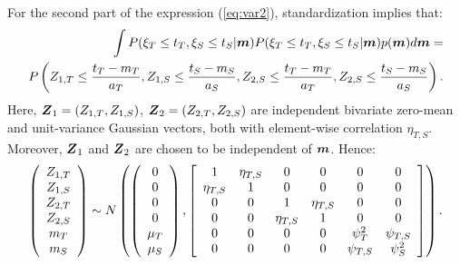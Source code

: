 \documentclass[aoas]{imsart}
\begin{document}
For the second part of the expression (\ref{eq:var2}), standardization
implies that: 
\begin{eqnarray}\label{part1:phi4}
&& \hspace{6mm} \int P(\xi_T \leq t_T, \xi_S \leq t_S|\bm) P(\xi_T \leq t_T, \xi_S \leq t_S|\bm) p(\bm) d\bm =  \\
&P& \hspace{-3mm} \left( Z_{1,T} \leq \frac{t_T-m_{T}}{a_{T}}, 
Z_{1,S} \leq \frac{t_S-m_{S}}{a_{S}},Z_{2,S} \leq \frac{t_T-m_{T}}{a_{T}}, 
Z_{2,S} \leq \frac{t_S-m_{S}}{a_{S}} \right). \nonumber
\end{eqnarray}
Here, ${\boldsymbol Z}_1=(Z_{1,T},Z_{1,S})$, ${\boldsymbol Z}_2=(Z_{2,T},Z_{2,S})$ are
independent bivariate zero-mean and unit-variance Gaussian vectors,
both with element-wise correlation $\eta_{T,S}$. Moreover, ${\boldsymbol Z}_1$ and
${\boldsymbol Z}_2$ are chosen to be independent of ${\boldsymbol m}$. Hence:
\begin{equation}
    \left(
    \begin{array}{cccccc}
         Z_{1,T} \\
         Z_{1,S} \\
         Z_{2,T} \\
         Z_{2,S} \\
         m_{T} \\
         m_{S}
    \end{array}
    \right)
\sim N \left(
\left(
    \begin{array}{cccccc}
    0 \\
    0 \\
    0 \\
    0 \\
          \mu_{T} \\
         \mu_{S} 
    \end{array}
    \right),
   \left[ 
      \begin{array}{cccccc}
        1 & \eta_{T,S} & 0 & 0 & 0 & 0  \\
        \eta_{T,S} & 1 & 0 & 0 & 0 & 0 \\
        0 & 0 & 1 & \eta_{T,S} & 0 & 0 \\
        0 & 0 & \eta_{T,S} & 1 & 0 & 0 \\
        0 & 0 & 0 & 0 & \psi^2_{T} & \psi_{T,S} \\
        0 & 0 & 0 & 0 & \psi_{T,S} & \psi^2_{S} 
    \end{array}
\right]
\right).
\vspace{0.2cm}
\end{equation}
\end{document}
